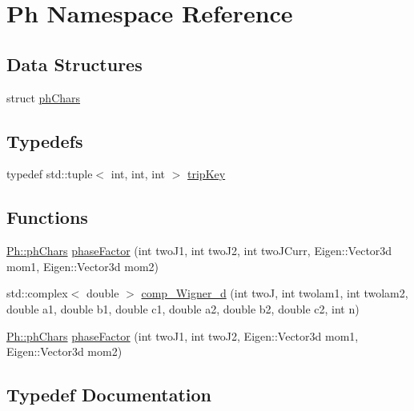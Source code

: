 \hypertarget{namespacePh}{}\section{Ph Namespace Reference}
\label{namespacePh}
\subsection*{Data Structures}
\begin{DoxyCompactItemize}
\item 
struct \mbox{\hyperlink{structPh_1_1phChars}{ph\+Chars}}
\end{DoxyCompactItemize}
\subsection*{Typedefs}
\begin{DoxyCompactItemize}
\item 
typedef std\+::tuple$<$ int, int, int $>$ \mbox{\hyperlink{namespacePh_afdd5bf3d7b37625115089ea3048e0cbb}{trip\+Key}}
\end{DoxyCompactItemize}
\subsection*{Functions}
\begin{DoxyCompactItemize}
\item 
\mbox{\hyperlink{structPh_1_1phChars}{Ph\+::ph\+Chars}} \mbox{\hyperlink{namespacePh_a438e6a04475dc71cc60cc5ad034e09b0}{phase\+Factor}} (int two\+J1, int two\+J2, int two\+J\+Curr, Eigen\+::\+Vector3d mom1, Eigen\+::\+Vector3d mom2)
\item 
std\+::complex$<$ double $>$ \mbox{\hyperlink{namespacePh_a47fd4e2846a9ce86464940bc5f4cccf8}{comp\+\_\+\+Wigner\+\_\+d}} (int twoJ, int twolam1, int twolam2, double a1, double b1, double c1, double a2, double b2, double c2, int n)
\item 
\mbox{\hyperlink{structPh_1_1phChars}{Ph\+::ph\+Chars}} \mbox{\hyperlink{namespacePh_a51140cf285f02c028134a1e40807b54b}{phase\+Factor}} (int two\+J1, int two\+J2, Eigen\+::\+Vector3d mom1, Eigen\+::\+Vector3d mom2)
\end{DoxyCompactItemize}


\subsection{Typedef Documentation}
\mbox{\label{namespacePh_afdd5bf3d7b37625115089ea3048e0cbb}} 
